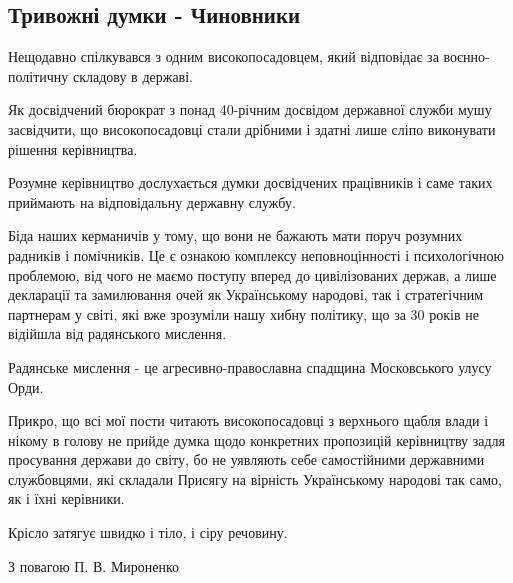  
 
 
 
 

\subsection{Тривожні думки - Чиновники}
\label{sec:10_04_2021.fb.myronenko_petro.2.chinovniki_ukraina}

Нещодавно спілкувався з одним високопосадовцем, який відповідає за
воєнно-політичну складову в державі.

Як досвідчений бюрократ з понад 40-річним досвідом державної служби мушу
засвідчити, що високопосадовці стали дрібними і здатні лише сліпо виконувати
рішення керівництва.

Розумне керівництво дослухається думки досвідчених працівників і саме таких
приймають на відповідальну державну службу. 

Біда наших керманичів у тому, що вони не бажають мати поруч розумних радників і
помічників. Це є ознакою комплексу неповноцінності і психологічною проблемою,
від чого не маємо поступу вперед до цивілізованих держав, а лише декларації та
замилювання очей як Українському народові, так і стратегічним партнерам у
світі, які вже зрозуміли нашу хибну політику, що за 30 років не відійшла від
радянського мислення.

Радянське мислення - це агресивно-православна спадщина Московського улусу Орди.

Прикро, що всі мої пости читають високопосадовці з верхнього щабля влади і
нікому в голову не прийде думка щодо конкретних пропозицій керівництву задля
просування держави до світу, бо не уявляють себе самостійними державними
службовцями, які складали Присягу на вірність Українському народові так само,
як і їхні керівники. 

Крісло затягує швидко і тіло, і сіру речовину.

З повагою П. В. Мироненко
